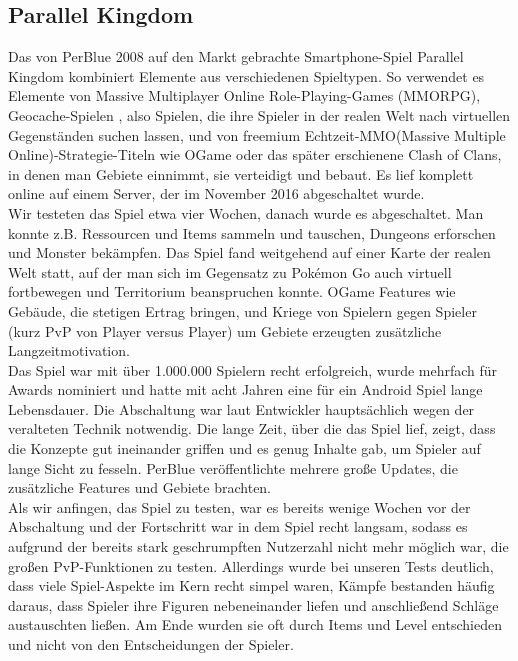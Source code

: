 \documentclass[extern,palatino]{cgBA}
\begin{document}
	\subsection{Parallel Kingdom}
	Das von PerBlue 2008 auf den Markt gebrachte Smartphone-Spiel Parallel Kingdom kombiniert Elemente aus verschiedenen Spieltypen. So verwendet es Elemente von Massive Multiplayer Online Role-Playing-Games (MMORPG)\cite{paki}, Geocache-Spielen \cite{paki}, also Spielen, die ihre Spieler in der realen Welt nach virtuellen Gegenständen suchen lassen, und von freemium Echtzeit-MMO(Massive Multiple Online)-Strategie-Titeln wie OGame oder das später erschienene Clash of Clans, in denen man Gebiete einnimmt, sie verteidigt und bebaut. Es lief komplett online auf einem Server, der im November 2016 abgeschaltet wurde. %
	\\Wir testeten das Spiel etwa vier Wochen, danach wurde es abgeschaltet. Man konnte z.B. Ressourcen und Items sammeln und tauschen, Dungeons erforschen und Monster bekämpfen. Das Spiel fand weitgehend auf einer Karte der realen Welt statt, auf der man sich im Gegensatz zu Pokémon Go auch virtuell fortbewegen und Territorium beanspruchen konnte. OGame Features wie Gebäude, die stetigen Ertrag bringen, und Kriege von Spielern gegen Spieler (kurz PvP von Player versus Player) um Gebiete erzeugten zusätzliche Langzeitmotivation.
	\\Das Spiel war mit über 1.000.000 Spielern\cite{pknow} recht erfolgreich, wurde mehrfach für Awards nominiert\cite{pkbae} und hatte mit acht Jahren eine für ein Android Spiel lange Lebensdauer. 
	Die Abschaltung war laut Entwickler hauptsächlich wegen der veralteten Technik notwendig\cite{pkcom}.
	Die lange Zeit, über die das Spiel lief, zeigt, dass die Konzepte gut ineinander griffen und es genug Inhalte gab, um Spieler auf lange Sicht zu fesseln. PerBlue veröffentlichte mehrere große Updates, die zusätzliche Features und Gebiete brachten.\\ Als wir anfingen, das Spiel zu testen, war es bereits wenige Wochen vor der Abschaltung und der Fortschritt war in dem Spiel recht langsam, sodass es aufgrund der bereits stark geschrumpften Nutzerzahl nicht mehr möglich war, die großen PvP-Funktionen zu testen. Allerdings wurde bei unseren Tests deutlich, dass viele Spiel-Aspekte im Kern recht simpel waren, Kämpfe bestanden häufig daraus, dass Spieler ihre Figuren nebeneinander liefen und anschließend Schläge austauschten ließen. Am Ende wurden sie oft durch Items und Level entschieden und nicht von den Entscheidungen der Spieler. 
\end{document}
